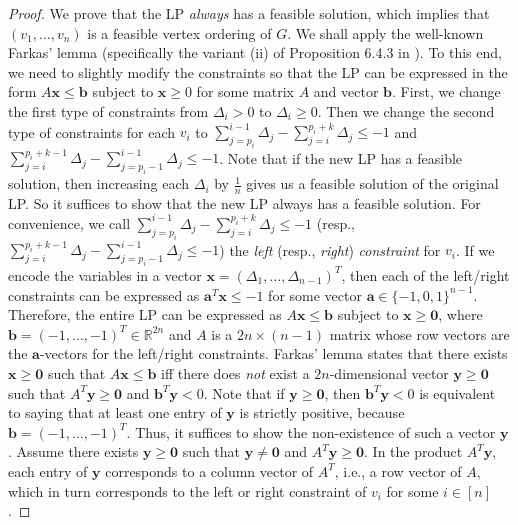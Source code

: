 \begin{proof}
We prove that the LP \textit{always} has a feasible solution, which implies that $(v_1,\dots,v_n)$ is a feasible vertex ordering of $G$.
We shall apply the well-known Farkas' lemma (specifically the variant (ii) of Proposition 6.4.3 in \cite{farkas-book}).
To this end, we need to slightly modify the constraints so that the LP can be expressed in the form $A \mathbf{x} \leq \mathbf{b}$ subject to $\mathbf{x} \geq 0$ for some matrix $A$ and vector $\mathbf{b}$.
First, we change the first type of constraints from $\Delta_i > 0$ to $\Delta_i \geq 0$.
Then we change the second type of constraints for each $v_i$ to $\sum_{j=p_i}^{i-1} \Delta_j - \sum_{j=i}^{p_i+k} \Delta_j \leq -1$ and $\sum_{j=i}^{p_i+k-1} \Delta_j - \sum_{j=p_i-1}^{i-1} \Delta_j \leq -1$.
Note that if the new LP has a feasible solution, then increasing each $\Delta_i$ by $\frac{1}{n}$ gives us a feasible solution of the original LP.
So it suffices to show that the new LP always has a feasible solution.
For convenience, we call $\sum_{j=p_i}^{i-1} \Delta_j - \sum_{j=i}^{p_i+k} \Delta_j \leq -1$ (resp., $\sum_{j=i}^{p_i+k-1} \Delta_j - \sum_{j=p_i-1}^{i-1} \Delta_j \leq -1$) the \textit{left} (resp., \textit{right}) \textit{constraint} for $v_i$.
If we encode the variables in a vector $\mathbf{x} = (\Delta_1,\dots,\Delta_{n-1})^T$, then each of the left/right constraints can be expressed as $\mathbf{a}^T \mathbf{x} \leq -1$ for some vector $\mathbf{a} \in \{-1,0,1\}^{n-1}$.
Therefore, the entire LP can be expressed as $A \mathbf{x} \leq \mathbf{b}$ subject to $\mathbf{x} \geq \mathbf{0}$, where $\mathbf{b} = (-1,\dots,-1)^T \in \mathbb{R}^{2n}$ and $A$ is a $2n \times (n-1)$ matrix whose row vectors are the $\mathbf{a}$-vectors for the left/right constraints.
Farkas' lemma states that there exists $\mathbf{x} \geq \mathbf{0}$ such that $A \mathbf{x} \leq \mathbf{b}$ iff there does \textit{not} exist a $2n$-dimensional vector $\mathbf{y} \geq \mathbf{0}$ such that $A^T \mathbf{y} \geq \mathbf{0}$ and $\mathbf{b}^T \mathbf{y} < 0$.
Note that if $\mathbf{y} \geq \mathbf{0}$, then $\mathbf{b}^T \mathbf{y} < 0$ is equivalent to saying that at least one entry of $\mathbf{y}$ is strictly positive, because $\mathbf{b} = (-1,\dots,-1)^T$.
Thus, it suffices to show the non-existence of such a vector $\mathbf{y}$.
Assume there exists $\mathbf{y} \geq \mathbf{0}$ such that $\mathbf{y} \neq \mathbf{0}$ and $A^T \mathbf{y} \geq \mathbf{0}$.
In the product $A^T \mathbf{y}$, each entry of $\mathbf{y}$ corresponds to a column vector of $A^T$, i.e., a row vector of $A$, which in turn corresponds to the left or right constraint of $v_i$ for some $i \in [n]$.

\end{proof}
